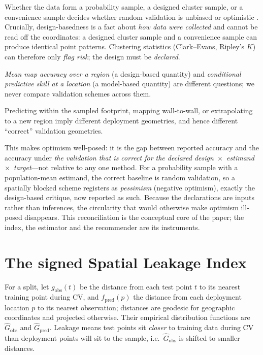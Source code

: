 \documentclass[11pt,a4paper]{article}
\begin{document}
\begin{description}[leftmargin=0pt,itemsep=3pt]
\item[Design.] Whether the data form a probability sample, a designed cluster
sample, or a convenience sample decides whether random validation is unbiased
\citep{wadoux2021spatial} or optimistic \citep{mila2022nndm}. Crucially,
design-basedness is a fact about \emph{how data were collected} and cannot be read
off the coordinates: a designed cluster sample and a convenience sample can produce
identical point patterns. Clustering statistics (Clark--Evans, Ripley's $K$) can
therefore only \emph{flag risk}; the design must be \emph{declared}.
\item[Estimand.] \emph{Mean map accuracy over a region} (a design-based quantity)
and \emph{conditional predictive skill at a location} (a model-based quantity) are
different questions; we never compare validation schemes across them.
\item[Target.] Predicting within the sampled footprint, mapping wall-to-wall, or
extrapolating to a new region imply different deployment geometries, and hence
different ``correct'' validation geometries.
\end{description}

This makes optimism well-posed: it is the gap between reported accuracy and the
accuracy under \emph{the validation that is correct for the declared
design~$\times$~estimand~$\times$~target}---not relative to any one method. For a
probability sample with a population-mean estimand, the correct baseline is random
validation, so a spatially blocked scheme registers as \emph{pessimism} (negative
optimism), exactly the design-based critique, now reported as such. Because the
declarations are inputs rather than inferences, the circularity that would otherwise
make optimism ill-posed disappears. This reconciliation is the conceptual core of
the paper; the index, the estimator and the recommender are its instruments.

\section{The signed Spatial Leakage Index}\label{sec:sli}

For a split, let $g_{\text{obs}}(t)$ be the distance from each test point $t$ to its
nearest training point during CV, and $f_{\text{pred}}(p)$ the distance from each
deployment location $p$ to its nearest observation; distances are geodesic for
geographic coordinates and projected otherwise. Their empirical distribution
functions are $\widehat{G}_{\text{obs}}$ and $\widehat{G}_{\text{pred}}$. Leakage
means test points sit \emph{closer} to training data during CV than deployment
points will sit to the sample, i.e.\ $\widehat{G}_{\text{obs}}$ is shifted to
smaller distances.
\end{document}
